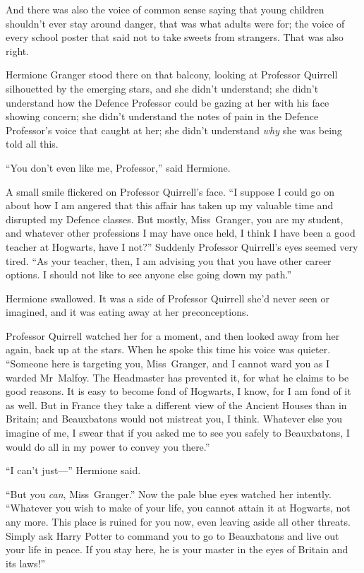 And there was also the voice of common sense saying that young children shouldn’t ever stay around danger, that was what adults were for; the voice of every school poster that said not to take sweets from strangers. That was also right.

Hermione Granger stood there on that balcony, looking at Professor Quirrell silhouetted by the emerging stars, and she didn’t understand; she didn’t understand how the Defence Professor could be gazing at her with his face showing concern; she didn’t understand the notes of pain in the Defence Professor’s voice that caught at her; she didn’t understand \emph{why} she was being told all this.

“You don’t even like me, Professor,” said Hermione.

A small smile flickered on Professor Quirrell’s face. “I suppose I could go on about how I am angered that this affair has taken up my valuable time and disrupted my Defence classes. But mostly, Miss~Granger, you are my student, and whatever other professions I may have once held, I think I have been a good teacher at Hogwarts, have I not?” Suddenly Professor Quirrell’s eyes seemed very tired. “As your teacher, then, I am advising you that you have other career options. I should not like to see anyone else going down my path.”

Hermione swallowed. It was a side of Professor Quirrell she’d never seen or imagined, and it was eating away at her preconceptions.

Professor Quirrell watched her for a moment, and then looked away from her again, back up at the stars. When he spoke this time his voice was quieter. “Someone here is targeting you, Miss~Granger, and I cannot ward you as I warded Mr~Malfoy. The Headmaster has prevented it, for what he claims to be good reasons. It is easy to become fond of Hogwarts, I know, for I am fond of it as well. But in France they take a different view of the Ancient Houses than in Britain; and Beauxbatons would not mistreat you, I think. Whatever else you imagine of me, I swear that if you asked me to see you safely to Beauxbatons, I would do all in my power to convey you there.”

“I can’t just—” Hermione said.

“But you \emph{can}, Miss~Granger.” Now the pale blue eyes watched her intently. “Whatever you wish to make of your life, you cannot attain it at Hogwarts, not any more. This place is ruined for you now, even leaving aside all other threats. Simply ask Harry Potter to command you to go to Beauxbatons and live out your life in peace. If you stay here, he is your master in the eyes of Britain and its laws!”

